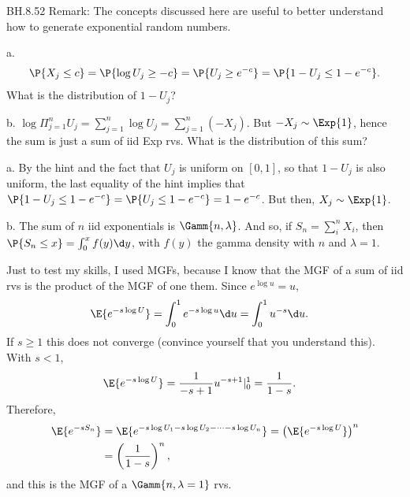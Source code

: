 
\setcounter{theorem}{51}
\begin{exercise} BH.8.52
Remark: The concepts discussed here are useful to better understand how to generate exponential random numbers.
\begin{hint}
a.
\begin{align*}
\P{X_j\leq c} = \P{ \log U_{j} \geq -c} = \P{ U_{j} \geq e^{-c}} = \P{1-U_{j} \leq 1-e^{-c}}.
\end{align*}
What is the distribution of $1-U_{j}$?

b. $\log \Pi_{j=1}^{n} U_{j} = \sum_{j=1}^n \log U_j = \sum_{j=1}^n (-X_{j})$.  But $-X_j\sim \Exp{1}$, hence the sum is just a sum of iid Exp rvs. What is the distribution of this sum?

\end{hint}
\begin{solution}
a. By the  hint and  the fact that $U_j$ is uniform on $[0,1]$, so that $1-U_j$ is also uniform,  the last  equality of the hint implies  that
$\P{ 1-U_{j} \leq 1- e^{-c}} = \P{ U_{j} \leq 1-e^{-c}} =  1-e^{-c}$.
But then, $X_{j}\sim \Exp{1}$.

b. The sum of $n$ iid exponentials is $\Gamm{n, \lambda}$. And so, if $S_n=\sum_i^n X_{i}$, then $\P{S_n\leq x} = \int_{0}^{x}f(y) \d y$, with $f(y)$ the gamma density with $n$ and $\lambda=1$.

Just to test my skills, I used MGFs, because I know that the MGF of a sum of iid rvs is the product of the MGF of one them. Since $e^{\log u} = u$,
\begin{align*}
  \E{e^{-s \log U}} &= \int_{0}^1 e^{-s \log u}\d u = \int_{0}^{1} u^{-s}\d u.
\end{align*}
If $s\geq 1$ this does not converge (convince yourself that you understand this). With $s<1$,
\begin{align*}
  \E{e^{-s \log U}} &= \frac1 {-s+1} u^{-s+1}|_0^1 = \frac{1}{1-s}.
\end{align*}
Therefore,
\begin{align*}
  \E{e^{-s S_n}}
  &=  \E{e^{-s \log U_1 -s \log U_2 - \cdots -s \log U_n}}
  = \left(\E{e^{-s\log U}}\right)^n \\
  &= \left(\frac{1}{1-s}\right)^{n},
\end{align*}
and this is the MGF of a $\Gamm{n, \lambda=1}$ rvs.
\end{solution}
\end{exercise}

